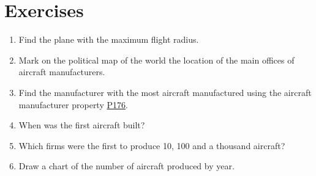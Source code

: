 
\section{Exercises}

\begin{enumerate}
\item Find the plane with the maximum flight radius.
\item Mark on the political map of the world the location of the main offices of aircraft manufacturers.
\item Find the manufacturer with the most aircraft manufactured using the aircraft manufacturer property \href{https://www.wikidata.org/wiki/Property:P176}{P176}.
\item When was the first aircraft built?
\item Which firms were the first to produce 10, 100 and a thousand aircraft?
\item Draw a chart of the number of aircraft produced by year.
\end{enumerate}
